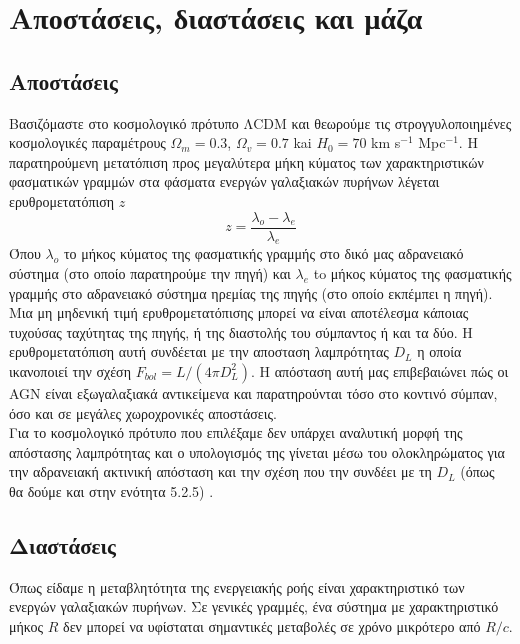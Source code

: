 \section{Αποστάσεις, διαστάσεις και μάζα}

\subsection*{Αποστάσεις}

Βασιζόμαστε στο κοσμολογικό πρότυπο Λ\textlatin{CDM} και θεωρούμε τις στρογγυλοποιημένες κοσμολογικές παραμέτρους $\Omega_m = 0.3$, $\Omega_v = 0.7$ kai $H_0 = 70$ \textlatin{km s}$^{-1}$ \textlatin{Mpc}$^{-1}$. Η παρατηρούμενη μετατόπιση προς μεγαλύτερα μήκη κύματος των χαρακτηριστικών φασματικών γραμμών στα φάσματα ενεργών γαλαξιακών πυρήνων λέγεται ερυθρομετατόπιση $z$ 
\begin{equation} z = \dfrac{\lambda_o - \lambda_e}{\lambda_e}\label{eq:redshift}\end{equation}
Όπου $\lambda_o$ το μήκος κύματος της φασματικής γραμμής στο δικό μας αδρανειακό σύστημα (στο οποίο παρατηρούμε την πηγή) και $\lambda_e$ to μήκος κύματος της φασματικής γραμμής στο αδρανειακό σύστημα ηρεμίας της πηγής (στο οποίο εκπέμπει η πηγή). Μια μη μηδενική τιμή ερυθρομετατόπισης μπορεί να είναι αποτέλεσμα κάποιας τυχούσας ταχύτητας της πηγής, ή της διαστολής του σύμπαντος ή και τα δύο. Η ερυθρομετατόπιση αυτή συνδέεται με την αποσταση λαμπρότητας $D_L$ η οποία ικανοποιεί την σχέση $F_{bol} = L/(4\pi D_L^2)$. Η απόσταση αυτή μας επιβεβαιώνει πώς οι \textlatin{AGN} είναι εξωγαλαξιακά αντικείμενα και παρατηρούνται τόσο στο κοντινό σύμπαν, όσο και σε μεγάλες χωροχρονικές αποστάσεις.\\ 
Για το κοσμολογικό πρότυπο που επιλέξαμε δεν υπάρχει αναλυτική μορφή της απόστασης λαμπρότητας και ο υπολογισμός της γίνεται μέσω του ολοκληρώματος για την αδρανειακή ακτινική απόσταση και την σχέση που την συνδέει με τη $D_L$ (όπως θα δούμε και στην ενότητα 5.2.5) \cite{netzer_2013}.

\subsection*{Διαστάσεις}

Όπως είδαμε η μεταβλητότητα της ενεργειακής ροής είναι χαρακτηριστικό των ενεργών γαλαξιακών πυρήνων. Σε γενικές γραμμές, ένα σύστημα με χαρακτηριστικό μήκος $R$ δεν μπορεί να υφίσταται σημαντικές μεταβολές σε χρόνο μικρότερο από $R/c$\cite{AccrPower}.

